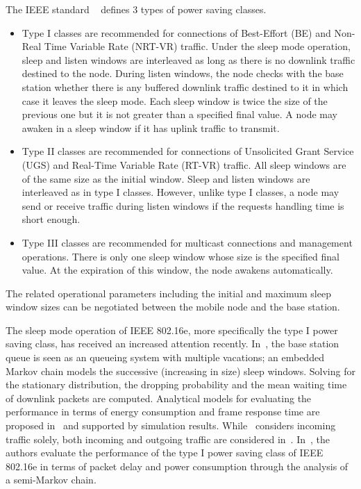 \documentclass[journal]{IEEEtran}
\begin{document}
The IEEE  standard ~\cite{man} defines 3 types of power saving classes.
\begin{itemize}
\item
Type I classes are recommended for connections of Best-Effort (BE) and Non-Real Time Variable Rate (NRT-VR) traffic. Under the sleep mode operation, sleep and listen windows are interleaved as long as
there is no downlink traffic destined to the node. During listen windows, the node checks with the base station whether there is any buffered downlink traffic destined to it in which case it leaves the sleep mode. Each sleep window is twice the size of the previous one but it is not greater than a specified final value. A node may awaken in a sleep window if it has uplink traffic to transmit.
\item
Type II classes are recommended for connections of Unsolicited Grant Service (UGS) and Real-Time Variable Rate (RT-VR) traffic. All sleep windows are of the same size as the initial window. Sleep and listen windows are interleaved as in type I classes. However, unlike type I classes, a node may send or receive traffic during listen windows if the requests handling time is short enough.
\item
Type III classes are recommended for multicast connections and management operations. There is only one sleep window whose size is the specified final value. At the expiration of this window, the node awakens automatically. 
\end{itemize}
The related operational parameters including the initial and maximum sleep window sizes can be negotiated between the mobile node and the base station. 

The sleep mode operation of IEEE 802.16e, more specifically the type I power saving class, has received an increased attention recently. In~\cite{vtc04}, the base station queue is seen as an  queueing system with multiple vacations; an embedded Markov chain models the successive (increasing in size) sleep windows. Solving for the stationary distribution, the dropping probability and the mean waiting time of downlink packets are computed. Analytical models for evaluating the performance in terms of energy consumption and frame response time are proposed in~\cite{Xiao05,Xiao06} and supported by simulation results. While~\cite{Xiao05} considers incoming traffic solely, both incoming and outgoing traffic are considered in~\cite{Xiao06}. In~\cite{vtc06}, the authors evaluate the performance of the type I power saving class of IEEE 802.16e in terms of packet delay and power consumption through the analysis of a semi-Markov chain. 
\end{document}
